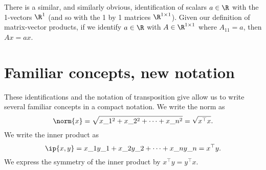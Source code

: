 There is a similar, and similarly obvious, identification of scalars $a \in \R $ with the 1-vectors $\R ^{1}$ (and so with the 1 by 1 matrices $\R ^{1 \times  1}$).
Given our definition of matrix-vector products, if we identify $a \in \R $ with $A \in \R ^{1 \times  1}$ where $A_{11} = a$, then $Ax = ax$.

\section*{Familiar concepts, new notation}

These identifications and the notation of transposition give allow us to write several familiar concepts in a compact notation.
We write the norm as
  \[
\norm{x} = \sqrt{x\_1^2 + x\_2^2 + \cdots + x\_n^2} = \sqrt{x^\top  x}.
  \]
We write the inner product as
  \[
\ip{x,y} =
x\_1y\_1 + x\_2y\_2 + \cdots + x\_ny\_n
= x^\top  y.
  \]
We express the symmetry of the inner product by $x^\top  y = y^\top  x$.
